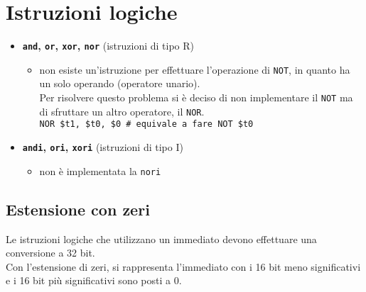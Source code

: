 \documentclass[../main.tex]{subfiles}
\begin{document}
\section{Istruzioni logiche}
\begin{itemize}
    \item \textbf{\texttt{and}, \texttt{or}, \texttt{xor}, \texttt{nor}} (istruzioni di tipo R)
    \begin{itemize}
        \item non esiste un'istruzione per effettuare l'operazione di
        \texttt{NOT}, in quanto ha un solo operando (operatore unario). \\
        Per risolvere questo problema si è deciso di non implementare
        il \texttt{NOT} ma di sfruttare un altro operatore, il \texttt{NOR}. \\
        \hspace*{0cm} \hspace*{0cm} \hspace*{0cm} \hspace*{0cm} \texttt{NOR \$t1, \$t0, \$0 \hspace*{0cm} \# equivale a fare NOT \$t0}
    \end{itemize}
    \vspace*{1mm}
    \item \textbf{\texttt{andi}, \texttt{ori}, \texttt{xori}} (istruzioni di tipo I)
    \begin{itemize}
        \item non è implementata la \texttt{nori}
    \end{itemize}
\end{itemize}

\subsection*{Estensione con zeri}
Le istruzioni logiche che utilizzano un immediato devono
effettuare una conversione a 32 bit. \\
Con l'estensione di zeri, si rappresenta l'immediato con i 16 bit
meno significativi e i 16 bit più significativi sono posti a 0.

\vspace*{5mm}
\end{document}
